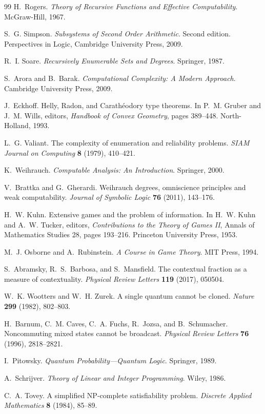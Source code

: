 \documentclass[11pt]{article}
\theoremstyle{plain}
\theoremstyle{definition}
\theoremstyle{remark}
\begin{document}
\begin{thebibliography}{99}
H.~Rogers. \emph{Theory of Recursive Functions and Effective Computability}.
McGraw-Hill, 1967.

S.~G. Simpson. \emph{Subsystems of Second Order Arithmetic}. Second edition.
Perspectives in Logic, Cambridge University Press, 2009.

R.~I. Soare. \emph{Recursively Enumerable Sets and Degrees}. Springer, 1987.

S.~Arora and B.~Barak. \emph{Computational Complexity: A Modern Approach}.
Cambridge University Press, 2009.

J.~Eckhoff. Helly, Radon, and Carath\'eodory type theorems. In
P.~M. Gruber and J.~M. Wills, editors, \emph{Handbook of Convex Geometry},
pages 389--448. North-Holland, 1993.

L.~G. Valiant. The complexity of enumeration and reliability problems.
\emph{SIAM Journal on Computing} \textbf{8} (1979), 410--421.

K.~Weihrauch. \emph{Computable Analysis: An Introduction}. Springer, 2000.


V.~Brattka and G.~Gherardi. Weihrauch degrees, omniscience principles and weak
computability. \emph{Journal of Symbolic Logic} \textbf{76} (2011), 143--176.

H.~W. Kuhn. Extensive games and the problem of information. In H.~W. Kuhn and
A.~W. Tucker, editors, \emph{Contributions to the Theory of Games II},
Annals of Mathematics Studies 28, pages 193--216. Princeton University Press,
1953.

M.~J. Osborne and A.~Rubinstein. \emph{A Course in Game Theory}. MIT Press,
1994.

S.~Abramsky, R.~S.~Barbosa, and S.~Mansfield. The contextual fraction as a
measure of contextuality. \emph{Physical Review Letters} \textbf{119} (2017),
050504.

W.~K. Wootters and W.~H. Zurek. A single quantum cannot be cloned.
\emph{Nature} \textbf{299} (1982), 802--803.

H.~Barnum, C.~M. Caves, C.~A. Fuchs, R.~Jozsa, and B.~Schumacher.
Noncommuting mixed states cannot be broadcast. \emph{Physical Review Letters}
\textbf{76} (1996), 2818--2821.

I.~Pitowsky. \emph{Quantum Probability---Quantum Logic}. Springer, 1989.


A.~Schrijver. \emph{Theory of Linear and Integer Programming}. Wiley, 1986.

C.~A. Tovey. A simplified NP-complete satisfiability problem. \emph{Discrete
Applied Mathematics} \textbf{8} (1984), 85--89.

\end{thebibliography}
\end{document}
